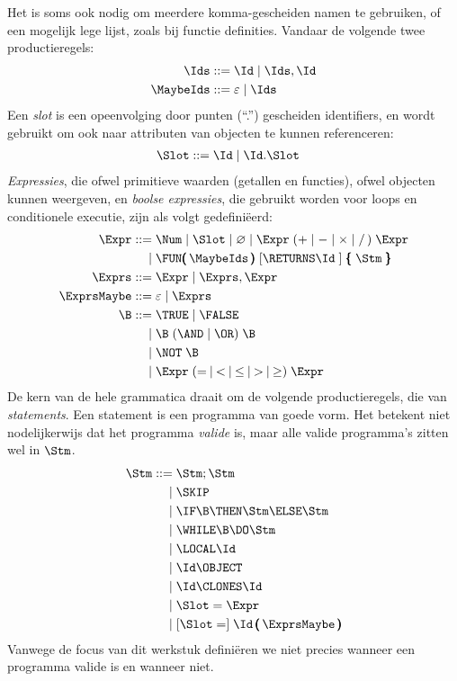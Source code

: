 Het is soms ook nodig om meerdere komma-gescheiden namen te gebruiken, of een mogelijk lege lijst, zoals bij functie definities. Vandaar de volgende twee productieregels:
\begin{align*}
  \Ids \GrammarDef \Id \mid \Ids, \Id \\
  \MaybeIds \GrammarDef \varepsilon \mid \Ids
\end{align*}
Een \emph{slot}%
is een opeenvolging door punten (``.'') gescheiden identifiers,%
en wordt gebruikt om ook naar attributen van objecten te kunnen referenceren:%
\begin{align*}
  \Slot \GrammarDef \Id \mid \Id . \Slot
\end{align*}
\emph{Expressies}, die ofwel primitieve waarden (getallen en functies), ofwel objecten kunnen weergeven, en \emph{boolse expressies}, die gebruikt worden voor loops en conditionele executie, zijn als volgt gedefiniëerd:%
\begin{align*}
  \Expr \GrammarDef \Num \mid \Slot \mid \varnothing \mid \Expr\; (+ \mid - \mid \times \mid /\,)\; \Expr \\
  \GrammarOr \FUN\pmb{(}\,\MaybeIds\,\pmb{)}\; \GrammarOpt{\RETURNS \Id\;} \pmb{\{}\; \Stm\; \pmb{\}} \\
  \Exprs \GrammarDef \Expr \mid \Exprs, \Expr \\
  \ExprsMaybe \GrammarDef \varepsilon \mid \Exprs \\
  \B \GrammarDef \TRUE \mid \FALSE \\
  \GrammarOr \B\; (\AND \mid \OR)\; \B \\
  \GrammarOr \NOT\; \B \\
  \GrammarOr \Expr\; (=\: \mid\: <\: \mid\: \le\: \mid\: >\: \mid\: \ge)\; \Expr
\end{align*}
De kern van de hele grammatica draait om de volgende productieregels, die van \emph{statements}. Een statement is een programma van goede vorm. Het betekent niet nodelijkerwijs%
dat het programma \emph{valide} is, maar alle valide programma's zitten wel in $\Stm$.
\begin{align*}
  \Stm \GrammarDef \Stm; \Stm \\
  \GrammarOr \SKIP \\
  \GrammarOr \IF \B \THEN \Stm \ELSE \Stm \\
  \GrammarOr \WHILE \B \DO \Stm \\
  \GrammarOr \LOCAL \Id \\
  \GrammarOr \Id \OBJECT \\
  \GrammarOr \Id \CLONES \Id \\
  \GrammarOr \Slot = \Expr \\
  \GrammarOr \GrammarOpt{\Slot =} \Id\,\pmb{(}\,\ExprsMaybe\,\pmb{)} \\
\end{align*}
Vanwege de focus van dit werkstuk definiëren we niet precies wanneer een programma valide is en wanneer niet.


